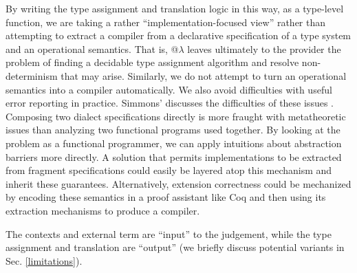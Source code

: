 \documentclass[9pt,preprint]{sigplanconf}
\begin{document}
By writing the type assignment and translation logic in this way, as a type-level function, we are taking a rather ``implementation-focused view'' rather than attempting to extract a compiler from a declarative specification of a type system and an operational semantics. That is, @$\lambda$ leaves ultimately to the provider the problem of finding a decidable type assignment algorithm and resolve non-determinism that may arise. Similarly, we do not attempt to turn an operational semantics into a compiler automatically. We  also avoid difficulties with useful error reporting in practice. Simmons' discusses the difficulties of these issues \cite{rjs-princeton}. Composing two dialect specifications directly is more fraught with metatheoretic issues than analyzing two functional programs used together. By looking at the problem as a functional programmer, we can apply intuitions about abstraction barriers more directly. A solution that permits implementations to be extracted from fragment specifications could easily be layered atop this mechanism and inherit these guarantees. Alternatively, extension correctness could be mechanized by encoding these semantics in a proof assistant like Coq and then using its extraction mechanisms to produce a compiler. 


The contexts and external term are ``input'' to the judgement, while the type assignment and translation are ``output'' (we briefly discuss potential variants in Sec. \ref{limitations}).

%
%
\end{document}
